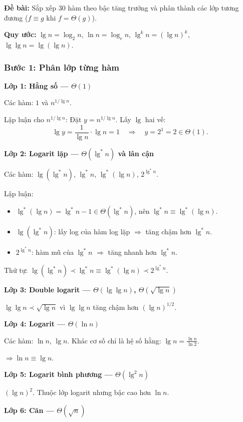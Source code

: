 \documentclass[12pt,a4paper]{article}
\begin{document}
\textbf{Đề bài:} Sắp xếp 30 hàm theo bậc tăng trưởng và phân thành các lớp tương đương
($f \equiv g$ khi $f = \Theta(g)$).

\textbf{Quy ước:} $\lg n = \log_2 n$, \; $\ln n = \log_e n$, \; $\lg^k n = (\lg n)^k$, \; $\lg\lg n = \lg(\lg n)$.

\subsubsection{Bước 1: Phân lớp từng hàm}

\textbf{Lớp 1: Hằng số --- $\Theta(1)$}

Các hàm: $1$ và $n^{1/\lg n}$.

Lập luận cho $n^{1/\lg n}$: Đặt $y = n^{1/\lg n}$. Lấy $\lg$ hai vế:
\[
  \lg y = \frac{1}{\lg n} \cdot \lg n = 1
  \quad\Longrightarrow\quad y = 2^1 = 2 \in \Theta(1).
\]

\textbf{Lớp 2: Logarit lặp --- $\Theta(\lg^* n)$ và lân cận}

Các hàm: $\lg(\lg^* n)$, $\lg^* n$, $\lg^*(\lg n)$, $2^{\lg^* n}$.

Lập luận:
\begin{itemize}[noitemsep]
  \item $\lg^*(\lg n) = \lg^* n - 1 \in \Theta(\lg^* n)$, nên $\lg^* n \equiv \lg^*(\lg n)$.
  \item $\lg(\lg^* n)$: lấy log của hàm log lặp $\Rightarrow$ tăng chậm hơn $\lg^* n$.
  \item $2^{\lg^* n}$: hàm mũ của $\lg^* n$ $\Rightarrow$ tăng nhanh hơn $\lg^* n$.
\end{itemize}

Thứ tự: $\lg(\lg^* n) \prec \lg^* n \equiv \lg^*(\lg n) \prec 2^{\lg^* n}$.

\textbf{Lớp 3: Double logarit --- $\Theta(\lg\lg n)$, $\Theta(\sqrt{\lg n})$}

$\lg\lg n \prec \sqrt{\lg n}$ vì $\lg\lg n$ tăng chậm hơn $(\lg n)^{1/2}$.

\textbf{Lớp 4: Logarit --- $\Theta(\ln n)$}

Các hàm: $\ln n$, $\lg n$. Khác cơ số chỉ là hệ số hằng: $\lg n = \frac{\ln n}{\ln 2}$.

$\Longrightarrow \ln n \equiv \lg n$.

\textbf{Lớp 5: Logarit bình phương --- $\Theta(\lg^2 n)$}

$(\lg n)^2$. Thuộc lớp logarit nhưng bậc cao hơn $\ln n$.

\textbf{Lớp 6: Căn --- $\Theta(\sqrt{n})$}
\end{document}
